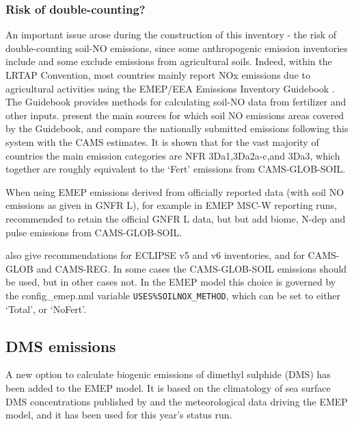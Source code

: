 \subsubsection{Risk of double-counting?}

An important issue arose during the construction  of this inventory - the risk of double-counting
soil-NO emissions, since some anthropogenic  emission inventories include and 
some exclude emissions from agricultural soils.
Indeed, within the LRTAP Convention,
most countries mainly report NOx emissions due to agricultural activities
using the EMEP/EEA Emissions Inventory Guidebook
\citep{Guidebook2019:3D}. The Guidebook provides methods for calculating
soil-NO data from fertilizer and other inputs.
\citet{SimpsonDarras:2021} present the main sources for which
 soil NO emissions areas covered by the Guidebook, and
compare the nationally
submitted emissions following this system with the CAMS estimates.
It is shown that for the vast majority of countries
the main emission categories are NFR  3Da1,3Da2a-c,and
3Da3, which together are roughly equivalent to
the `Fert' emissions from CAMS-GLOB-SOIL.

When using EMEP emissions derived from
officially reported data (with soil NO emissions as given in GNFR L),
for example in EMEP MSC-W reporting runs,
\citet{SimpsonDarras:2021} recommended to retain the
official GNFR L data, but but add biome, N-dep and pulse emissions from CAMS-GLOB-SOIL.

\citet{SimpsonDarras:2021} also give recommendations for
ECLIPSE v5 and v6 inventories, and for CAMS-GLOB and CAMS-REG. In
some cases the CAMS-GLOB-SOIL \Nfert emissions should be used, but
in other cases not. In the EMEP model this choice is governed
by the config\_emep.nml variable \verb|USES%SOILNOX_METHOD|, which can
be set to either `Total', or `NoFert'. 



\subsection{DMS emissions}
\label{ssec:DMS}


A new option to calculate biogenic emissions of dimethyl sulphide (DMS) has been added to the EMEP model. It is based on the climatology of sea surface DMS concentrations published by \citet{Lana2011} and the meteorological data driving the EMEP model, and it has been used for this year's status run. 


